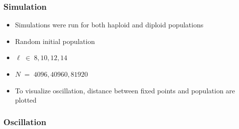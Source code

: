 \documentclass[aspectratio=169]{beamer}
\begin{document}
  \begin{frame}
    \frametitle{Simulation}
    \begin{itemize}
      \item{Simulations were run for both haploid and diploid populations}
      \item{Random initial population}     
      \item{$\ell \;\in\; {8, 10, 12, 14}$}
      \item{$N \;=\; {4096, 40960, 81920}$}
      \item{To visualize oscillation, distance between fixed points and population are plotted}
    \end{itemize}
  \end{frame}
  
  \begin{frame}
    \frametitle{Oscillation}
    \begin{figure}[!h]
      \begin{center}
	 \hspace{-2.3em}%
	 \hspace{-2.3em}%

\end{center}
\end{figure}
\end{frame}
\end{document}
